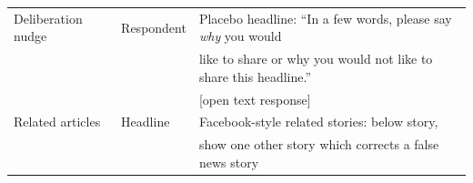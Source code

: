 \documentclass[letterpaper, 12pt, parskip=full,]{scrartcl}
\begin{document}
\begin{table}[H]
\begin{tabular}{l|l|l}
\\
Deliberation nudge                                                                                 & Respondent                                                                                                   & Placebo headline: ``In a few words, please say \textit{why} you would\\ & & like to share or why you would not like to share this headline.''\\ & & [open text response]
\\
Related articles                                                                                                       & Headline                                                                                                     & Facebook-style related stories: below story,\\ & & show one other story which corrects a false news story                                                                                                                                                                                                                                                                                             \\

\end{tabular}
\end{table}
\end{document}
